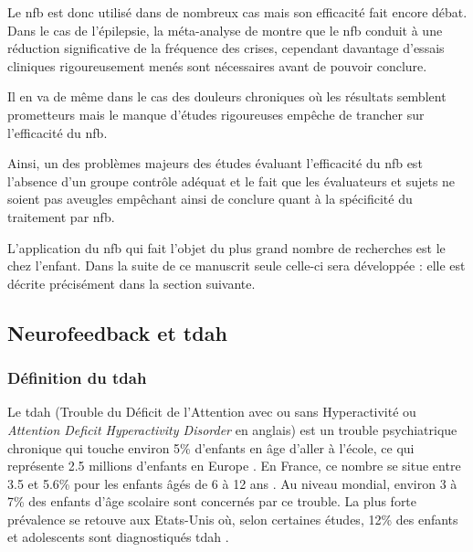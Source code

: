 Le \gls{nfb} est donc utilisé dans de nombreux cas mais son efficacité fait encore débat. Dans le cas de l'épilepsie, la méta-analyse de \citet{Tan2009}
montre que le \gls{nfb} conduit à une réduction significative de la fréquence des crises, cependant davantage d'essais cliniques
rigoureusement menés sont nécessaires avant de pouvoir conclure. 

Il en va de même dans le cas des douleurs chroniques où les résultats semblent prometteurs \citep{Mayaud2019} mais le manque d'études rigoureuses empêche de
trancher sur l'efficacité du \gls{nfb}.

Ainsi, un des problèmes majeurs des études évaluant l'efficacité du \gls{nfb} est l'absence d'un groupe contrôle adéquat et le fait que les évaluateurs et sujets
ne soient pas aveugles \citep{Thibault2017, Thibault2017climate, Jeunet2018} empêchant ainsi de conclure quant à la spécificité du traitement par \gls{nfb}.

L'application du \gls{nfb} qui fait l'objet du plus grand nombre de recherches est le  chez l'enfant. Dans la suite de ce manuscrit seule 
celle-ci sera développée : elle est décrite précisément dans la section suivante.

\subsection{Neurofeedback et \gls{tdah}} \label{nfb_and_adhd}

\subsubsection{Définition du \gls{tdah}}

Le \gls{tdah} (Trouble du Déficit de l'Attention avec ou sans Hyperactivité ou \textit{Attention Deficit Hyperactivity Disorder} en anglais) est un trouble psychiatrique chronique qui touche environ 5\% d'enfants en âge d'aller à l'école, 
ce qui représente 2.5 millions d'enfants en Europe \citep{DSM-5}. En France, ce nombre se situe entre 3.5 et 5.6\% pour les enfants âgés de 6 à 12 ans \citep{Lecendreux2011}. 
Au niveau mondial, environ 3 à 7\% des enfants d'âge scolaire sont concernés par ce trouble. La plus forte prévalence se retouve aux Etats-Unis où, selon certaines
études, 12\% des enfants et adolescents
sont diagnostiqués \gls{tdah} \citep{Collins2016}.

